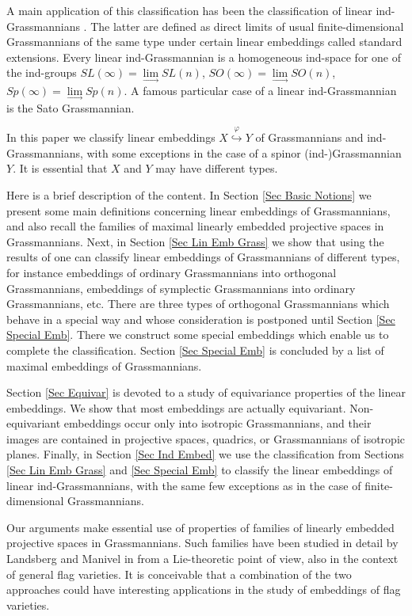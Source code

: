 \documentclass[12pt]{amsart}
\def\hw  {\hookrightarrow}
\begin{document}
A main application of this classification has been the classification of linear ind-Grassmannians \cite{Penkov-Tikhomirov-Lin-ind-Grass}. The latter are defined as direct limits of usual finite-dimensional Grassmannians of the same type under certain linear embeddings called standard extensions. Every linear ind-Grassmannian is a homogeneous ind-space for one of the ind-groups $SL(\infty)=\lim\limits_{\to} SL(n)$, $SO(\infty)=\lim\limits_{\to} SO(n)$, $Sp(\infty)=\lim\limits_{\to} Sp(n)$. A famous particular case of a linear ind-Grassmannian is the Sato Grassmannian.

In this paper we classify linear embeddings $X\stackrel{\varphi}{\hw}Y$ of Grassmannians and ind-Grassmannians, with some exceptions in the case of a spinor (ind-)Grassmannian $Y$. It is essential that $X$ and $Y$ may have different types.

Here is a brief description of the content. In Section \ref{Sec Basic Notions} we present some main definitions concerning linear embeddings of Grassmannians, and also recall the families of maximal linearly embedded projective spaces in Grassmannians. Next, in Section \ref{Sec Lin Emb Grass} we show that using the results of \cite{Penkov-Tikhomirov-Lin-ind-Grass} one can classify linear embeddings of Grassmannians of different types, for instance embeddings of ordinary Grassmannians into orthogonal Grassmannians, embeddings of symplectic Grassmannians into ordinary Grassmannians, etc. There are three types of orthogonal Grassmannians which behave in a special way and whose consideration is postponed until Section \ref{Sec Special Emb}. There we construct some special embeddings which enable us to complete the classification. Section \ref{Sec Special Emb} is concluded by a list of maximal embeddings of Grassmannians.

Section \ref{Sec Equivar} is devoted to a study of equivariance properties of the linear embeddings. We show that most embeddings are actually equivariant. Non-equivariant embeddings occur only into isotropic Grassmannians, and their images are contained in projective spaces, quadrics, or Grassmannians of isotropic planes. Finally, in Section \ref{Sec Ind Embed} we use the classification from Sections \ref{Sec Lin Emb Grass} and \ref{Sec Special Emb} to classify the linear embeddings of linear ind-Grassmannians, with the same few exceptions as in the case of finite-dimensional Grassmannians.

Our arguments make essential use of properties of families of linearly embedded projective spaces in Grassmannians. Such families have been studied in detail by Landsberg and Manivel in \cite{Lands-Mani-2003-ProjGeo} from a Lie-theoretic point of view, also in the context of general flag varieties. It is conceivable that a combination of the two approaches could have interesting applications in the study of embeddings of flag varieties.\\
\end{document}
